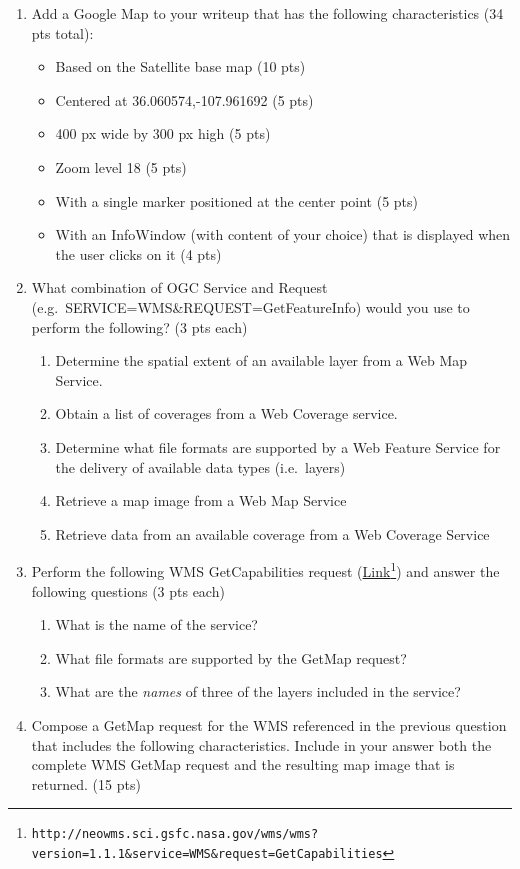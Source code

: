 \documentclass[]{article}
\providecommand{\tightlist}{%
  \setlength{\itemsep}{0pt}\setlength{\parskip}{0pt}}
\begin{document}
\begin{enumerate}
\item
  Add a Google Map to your writeup that has the following
  characteristics (34 pts total):

  \begin{itemize}
  \tightlist
  \item
    Based on the Satellite base map (10 pts)
  \item
    Centered at 36.060574,-107.961692 (5 pts)
  \item
    400 px wide by 300 px high (5 pts)
  \item
    Zoom level 18 (5 pts)
  \item
    With a single marker positioned at the center point (5 pts)
  \item
    With an InfoWindow (with content of your choice) that is displayed
    when the user clicks on it (4 pts)
  \end{itemize}
\item
  What combination of OGC Service and Request
  (e.g.~SERVICE=WMS\&REQUEST=GetFeatureInfo) would you use to perform
  the following? (3 pts each)

  \begin{enumerate}
  \def\labelenumii{\alph{enumii}.}
  \tightlist
  \item
    Determine the spatial extent of an available layer from a Web Map
    Service.
  \item
    Obtain a list of coverages from a Web Coverage service.
  \item
    Determine what file formats are supported by a Web Feature Service
    for the delivery of available data types (i.e.~layers)
  \item
    Retrieve a map image from a Web Map Service
  \item
    Retrieve data from an available coverage from a Web Coverage
    Service 
  \end{enumerate}
\item
  Perform the following WMS GetCapabilities request
  (\href{http://neowms.sci.gsfc.nasa.gov/wms/wms?version=1.1.1\&service=WMS\&request=GetCapabilities}{Link\footnote{\texttt{http://neowms.sci.gsfc.nasa.gov/wms/wms?version=1.1.1\&service=WMS\&request=GetCapabilities}}})
  and answer the following questions (3 pts each)

  \begin{enumerate}
  \def\labelenumii{\alph{enumii}.}
  \tightlist
  \item
    What is the name of the service?
  \item
    What file formats are supported by the GetMap request?
  \item
    What are the \emph{names} of three of the layers included in the
    service?
  \end{enumerate}
\item
  Compose a GetMap request for the WMS referenced in the previous
  question that includes the following characteristics. Include in your
  answer both the complete WMS GetMap request and the resulting map
  image that is returned. (15 pts)


\end{enumerate}
\end{document}
